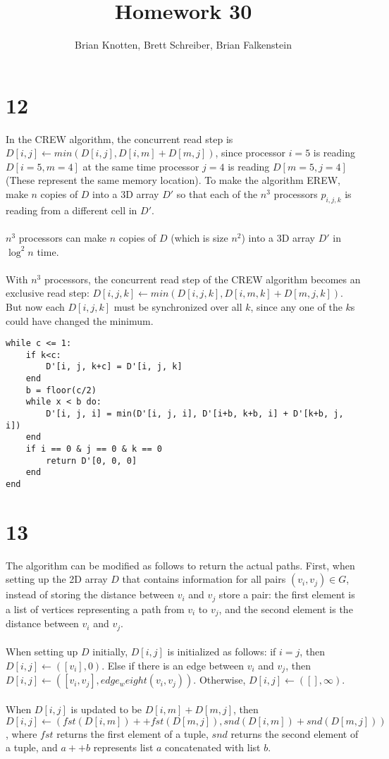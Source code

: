 \documentclass[letterpaper,notitlepage,twoside]{article}
\begin{document}
\title{Homework 30}
\author{Brian Knotten, Brett Schreiber, Brian Falkenstein}
\maketitle

\section*{12}
In the CREW algorithm, the concurrent read step is $D[i,j] \gets min(D[i, j], D[i, m] + D[m, j])$, since processor $i = 5$ is reading $D[i = 5, m = 4]$ at the same time processor $j = 4$ is reading $D[m = 5, j = 4]$ (These represent the same memory location). To make the algorithm EREW, make $n$ copies of $D$ into a 3D array $D'$ so that each of the $n^3$ processors $p_{i, j, k}$ is reading from a different cell in $D'$.
\\\\
$n^3$ processors can make $n$ copies of $D$ (which is size $n^2$) into a 3D array $D'$ in $\log^2 n$ time.
\\\\
With $n^3$ processors, the concurrent read step of the CREW algorithm becomes an exclusive read step: $D[i, j, k] \gets min(D[i, j, k], D[i, m, k] + D[m, j, k])$. But now each $D[i, j, k]$ must be synchronized over all $k$, since any one of the $k$s could have changed the minimum. 
\begin{verbatim}
while c <= 1:
	if k<c:
		D'[i, j, k+c] = D'[i, j, k]
	end
	b = floor(c/2)
	while x < b do:
		D'[i, j, i] = min(D'[i, j, i], D'[i+b, k+b, i] + D'[k+b, j, i])
	end
	if i == 0 & j == 0 & k == 0
		return D'[0, 0, 0]
	end
end
\end{verbatim}

\section*{13}
The algorithm can be modified as follows to return the actual paths. First, when setting up the 2D array $D$ that contains information for all pairs $(v_i, v_j) \in G$, instead of storing the distance between $v_i$ and $v_j$ store a pair: the first element is a list of vertices representing a path from $v_i$ to $v_j$, and the second element is the distance between $v_i$ and $v_j$.
\\\\
When setting up $D$ initially, $D[i, j]$ is initialized as follows: if $i = j$, then $D[i, j] \gets ([v_i], 0)$. Else if there is an edge between $v_i$ and $v_j$, then $D[i, j] \gets ([v_i, v_j], edge_weight(v_i, v_j))$. Otherwise, $D[i, j] \gets ([], \infty)$.
\\\\
When $D[i, j]$ is updated to be $D[i, m] + D[m, j]$, then $D[i, j] \gets (fst(D[i, m]) ++ fst(D[m, j]), snd(D[i, m]) + snd(D[m, j]))$, where $fst$ returns the first element of a tuple, $snd$ returns the second element of a tuple, and $a ++ b$ represents list $a$ concatenated with list $b$.
\end{document}
